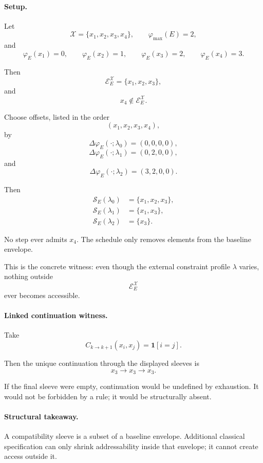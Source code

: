 \documentclass[aps,prx,onecolumn,11pt]{revtex4-2}
\theoremstyle{plain}
\theoremstyle{definition}
\theoremstyle{remark}
\begin{document}
\paragraph{Setup.}

Let
\[
\mathcal X=\{x_1,x_2,x_3,x_4\},
\qquad
\varphi_{\max}(E)=2,
\]
and
\[
\varphi_E(x_1)=0,
\qquad
\varphi_E(x_2)=1,
\qquad
\varphi_E(x_3)=2,
\qquad
\varphi_E(x_4)=3.
\]

Then
\[
\mathcal E_E^{\mathcal X}
=
\{x_1,x_2,x_3\},
\]
and
\[
x_4\notin\mathcal E_E^{\mathcal X}.
\]

Choose offsets, listed in the order
\[
(x_1,x_2,x_3,x_4),
\]
by
\[
\Delta\varphi_E(\cdot;\lambda_0)
=
(0,0,0,0),
\]
\[
\Delta\varphi_E(\cdot;\lambda_1)
=
(0,2,0,0),
\]
and
\[
\Delta\varphi_E(\cdot;\lambda_2)
=
(3,2,0,0).
\]

Then
\begin{align*}
\mathcal S_E(\lambda_0)
&=
\{x_1,x_2,x_3\},
\\
\mathcal S_E(\lambda_1)
&=
\{x_1,x_3\},
\\
\mathcal S_E(\lambda_2)
&=
\{x_3\}.
\end{align*}

No step ever admits \(x_4\). The schedule only removes elements from
the baseline envelope.

This is the concrete witness: even though the external constraint
profile \(\lambda\) varies, nothing outside
\[
\mathcal E_E^{\mathcal X}
\]
ever becomes accessible.

\paragraph{Linked continuation witness.}

Take
\[
C_{k\to k+1}(x_i,x_j)
=
\mathbf 1[i=j].
\]

Then the unique continuation through the displayed sleeves is
\[
x_3\to x_3\to x_3.
\]

If the final sleeve were empty, continuation would be undefined by
exhaustion. It would not be forbidden by a rule; it would be
structurally absent.

\paragraph{Structural takeaway.}

A compatibility sleeve is a subset of a baseline envelope. Additional
classical specification can only shrink addressability inside that
envelope; it cannot create access outside it.
\end{document}
